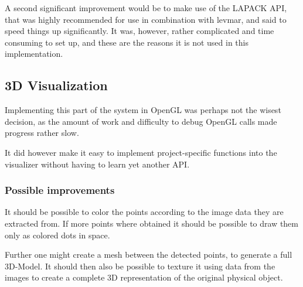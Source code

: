 A second significant improvement would be to make use of the LAPACK API, that was highly recommended for use in combination with levmar, and said to speed things up significantly. It was, however, rather complicated and time consuming to set up, and these are the reasons it is not used in this implementation.

\subsection{3D Visualization}
Implementing this part of the system in OpenGL was perhaps not the wisest decision, as the amount of work and difficulty to debug OpenGL calls made progress rather slow.

It did however make it easy to implement project-specific functions into the visualizer without having to learn yet another API.

\subsubsection{Possible improvements}
It should be possible to color the points according to the image data they are extracted from. If more points where obtained it should be possible to draw them only as colored dots in space.

Further one might create a mesh between the detected points, to generate a full 3D-Model. It should then also be possible to texture it using data from the images to create a complete 3D representation of the original physical object.